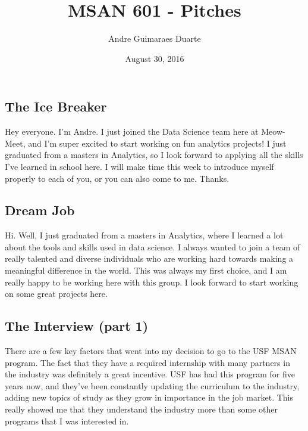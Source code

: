 \documentclass[]{article}
\title{MSAN 601 - Pitches}
\author{Andre Guimaraes Duarte}
\date{August 30, 2016}
\begin{document}
\maketitle


\subsection*{The Ice Breaker}
Hey everyone. I'm Andre. I just joined the Data Science team here at Meow-Meet, and I'm super excited to start working on fun analytics projects! I just graduated from a masters in Analytics, so I look forward to applying all the skills I've learned in school here. I will make time this week to introduce myself properly to each of you, or you can also come to me. Thanks.

\subsection*{Dream Job}
Hi. Well, I just graduated from a masters in Analytics, where I learned a lot about the tools and skills used in data science. I always wanted to join a team of really talented and diverse individuals who are working hard towards making a meaningful difference in the world. This was always my first choice, and I am really happy to be working here with this group. I look forward to start working on some great projects here.

\subsection*{The Interview (part 1)}
There are a few key factors that went into my decision to go to the USF MSAN program. The fact that they have a required internship with many partners in the industry was definitely a great incentive. USF has had this program for five years now, and they've been constantly updating the curriculum to the industry, adding new topics of study as they grow in importance in the job market. This really showed me that they understand the industry more than some other programs that I was interested in.
\end{document}
